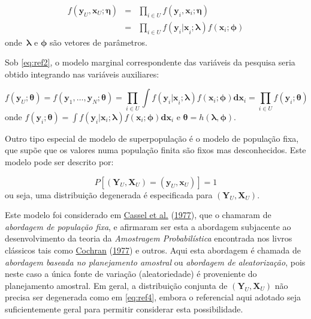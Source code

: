 \documentclass[
  12pt,
  brazilian,
]{book}
\theoremstyle{definition}
\theoremstyle{definition}
\theoremstyle{definition}
\theoremstyle{definition}
\theoremstyle{remark}
\begin{document}
\begin{eqnarray}
f \left( \mathbf{y}_U , \mathbf{x}_U ; \mathbf{\eta} \right) 
&=&\prod_{i\in U} f\left(\mathbf{y}_i , \mathbf{x}_i ; \mathbf{\eta} \right) \label{eq:ref1} \\
&=&\prod_{i\in U} f\left( \mathbf{y}_i \mathbf{|x}_i ; \mathbf{\lambda} \right) 
f\left( \mathbf{x}_i ; \mathbf{\phi} \right) \label{eq:ref2}
\end{eqnarray} onde~\(\mathbf{\lambda}\) e \(\mathbf{\phi}\) são vetores de
parâmetros.

Sob \eqref{eq:ref2}, o modelo marginal correspondente das variáveis da pesquisa
seria obtido integrando nas variáveis auxiliares:

\begin{equation}
f(\mathbf{y}_U ; \mathbf{\theta}) = f(\mathbf{y}_1 ,\ldots ,\mathbf{y}_N ; \mathbf{\theta}) = \prod_{i\in U} \int f\left( \mathbf{y}_i \mathbf{|x}_i ; \mathbf{\lambda} \right) f\left( \mathbf{x}_i ; \mathbf{\phi} \right) \mathbf{dx}_i = \prod_{i\in U} f\left( \mathbf{y}_i ; \mathbf{\theta} \right) \label{eq:ref3}
\end{equation} onde
\(f\left( \mathbf{y}_i ; \mathbf{\theta} \right) = \int f\left( \mathbf{y}_i | \mathbf{x}_i ; \mathbf{\lambda} \right) f\left( \mathbf{x}_i ; \mathbf{\phi} \right) \mathbf{dx}_i\)
e \(\mathbf{\theta =} h\left( \mathbf{\lambda} , \mathbf{\phi} \right)\).

Outro tipo especial de modelo de superpopulação é o modelo de população fixa,
que supõe que os valores numa população finita são fixos mas desconhecidos. Este
modelo pode ser descrito por:

\begin{equation}
P\left[ \left( \mathbf{Y}_U , \mathbf{X}_U \right) = \left( \mathbf{y}_U , \mathbf{x}_U \right) \right] = 1 \label{eq:ref4}
\end{equation} ou seja, uma distribuição degenerada é especificada para
\(\left(\mathbf{Y}_U , \mathbf{X}_U \right)\).

Este modelo foi considerado em \protect\hyperlink{ref-cassel}{Cassel et al.} (\protect\hyperlink{ref-cassel}{1977}), que o chamaram de \emph{abordagem de
população fixa}, e afirmaram ser esta a abordagem subjacente ao desenvolvimento
da teoria da \emph{Amostragem Probabilística} encontrada nos livros clássicos tais
como \protect\hyperlink{ref-cochran}{Cochran} (\protect\hyperlink{ref-cochran}{1977}) e outros. Aqui esta abordagem é chamada de \emph{abordagem baseada no
planejamento amostral} ou \emph{abordagem de aleatorização}, pois neste caso a única
fonte de variação (aleatoriedade) é proveniente do planejamento amostral. Em
geral, a distribuição conjunta de \(\left( \mathbf{Y}_U , \mathbf{X}_U \right)\)
não precisa ser degenerada como em \eqref{eq:ref4}, embora o referencial aqui
adotado seja suficientemente geral para permitir considerar esta possibilidade.
\end{document}
